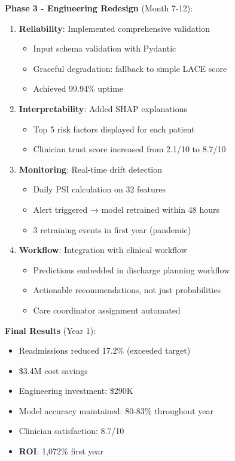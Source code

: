 \textbf{Phase 3 - Engineering Redesign} (Month 7-12):

\begin{enumerate}
    \item \textbf{Reliability}: Implemented comprehensive validation
        \begin{itemize}
            \item Input schema validation with Pydantic
            \item Graceful degradation: fallback to simple LACE score
            \item Achieved 99.94\% uptime
        \end{itemize}

    \item \textbf{Interpretability}: Added SHAP explanations
        \begin{itemize}
            \item Top 5 risk factors displayed for each patient
            \item Clinician trust score increased from 2.1/10 to 8.7/10
        \end{itemize}

    \item \textbf{Monitoring}: Real-time drift detection
        \begin{itemize}
            \item Daily PSI calculation on 32 features
            \item Alert triggered → model retrained within 48 hours
            \item 3 retraining events in first year (pandemic)
        \end{itemize}

    \item \textbf{Workflow}: Integration with clinical workflow
        \begin{itemize}
            \item Predictions embedded in discharge planning workflow
            \item Actionable recommendations, not just probabilities
            \item Care coordinator assignment automated
        \end{itemize}
\end{enumerate}

\textbf{Final Results} (Year 1):
\begin{itemize}
    \item Readmissions reduced 17.2\% (exceeded target)
    \item \$3.4M cost savings
    \item Engineering investment: \$290K
    \item Model accuracy maintained: 80-83\% throughout year
    \item Clinician satisfaction: 8.7/10
    \item \textbf{ROI}: 1,072\% first year
\end{itemize}

